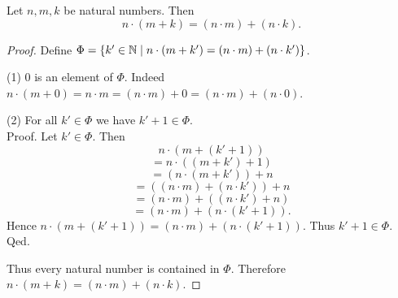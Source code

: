 \documentclass[10pt]{article}
\begin{document}
  \begin{forthel}
    \begin{proposition}
      Let $n, m, k$ be natural numbers.
      Then \[ n \cdot (m + k) = (n \cdot m) + (n \cdot k). \]
    \end{proposition}
    \begin{proof}
      Define $\Phi = \{ k' \in \mathbb{N} \mid n \cdot (m + k') =
      (n \cdot m) + (n \cdot k') \}$.

      (1) $0$ is an element of $\Phi$.
      Indeed $n \cdot (m + 0)
        = n \cdot m
        = (n \cdot m) + 0
        = (n \cdot m) + (n \cdot 0)$.

      (2) For all $k' \in \Phi$ we have $k' + 1 \in \Phi$. \\
      Proof.
        Let $k'\in \Phi$.
        Then
        \[  n \cdot (m + (k' + 1))                  \]
        \[    = n \cdot ((m + k') + 1)              \]
        \[    = (n \cdot (m + k')) + n              \]
        \[    = ((n \cdot m) + (n \cdot k')) + n    \]
        \[    = (n \cdot m) + ((n \cdot k') + n)    \]
        \[    = (n \cdot m) + (n \cdot (k' + 1)).   \]
        Hence $n \cdot (m + (k' + 1)) = (n \cdot m) + (n \cdot (k' + 1))$.
        Thus $k' + 1 \in \Phi$.
      Qed.

      Thus every natural number is contained in $\Phi$.
      Therefore $n \cdot (m + k) = (n \cdot m) + (n \cdot k)$.
    \end{proof}
  \end{forthel}
\end{document}
